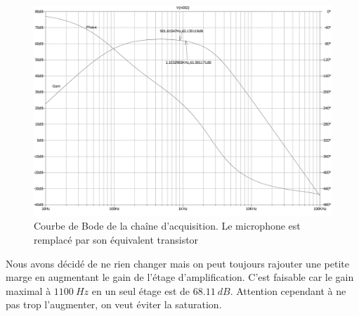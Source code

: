 \begin{figure}[H]
    \centering
    \includegraphics[width=\textwidth]{pdffiles/BodeCircuitJET.pdf}
    \caption{Courbe de Bode de la chaîne d'acquisition. Le microphone est remplacé par son équivalent transistor}
    \label{fig:BodeFullCircuitJet}
\end{figure}

Nous avons décidé de ne rien changer mais on peut toujours rajouter une petite marge en augmentant le gain de l'étage d'amplification. C'est faisable car le gain maximal à $1100 \ Hz$ en un seul étage est de $68.11 \ dB$. Attention cependant à ne pas trop l'augmenter, on veut éviter la saturation.